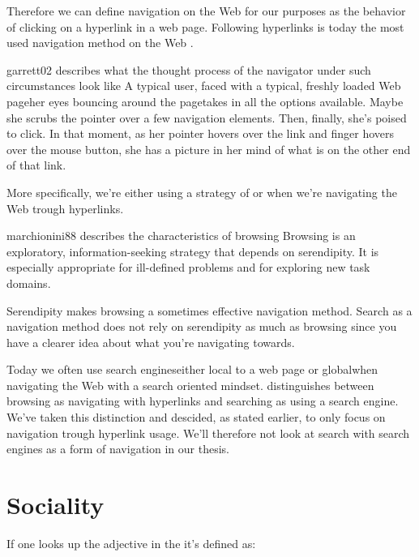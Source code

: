 Therefore we can define navigation on the Web for our purposes as the
behavior of clicking on a hyperlink in a web page. Following hyperlinks is
today the most used navigation method on the Web \citep[]{weinreich08}.
\begin{fullquote}{garrett02}{%
  describes what the thought process of the navigator under
  such circumstances look like}
    A typical user, faced with a typical, freshly loaded Web page\dash{}her
    eyes bouncing around the page\dash{}takes in all the options available.
    Maybe she scrubs the pointer over a few navigation elements. Then,
    finally, she's poised to click. In that moment, as her pointer hovers over
    the link and finger hovers over the mouse button, she has a picture in her
    mind of what is on the other end of that link.
\end{fullquote}

More specifically, we're either using a strategy of  or
 when we're navigating the Web trough hyperlinks.
\begin{fullquote}[\p{71}]{marchionini88}{%
  describes the characteristics of browsing}
    Browsing is an exploratory, information-seeking
    strategy that depends on serendipity. It is
    especially appropriate for ill-defined problems
    and for exploring new task domains.
\end{fullquote}
Serendipity\dash{}%
\dash{}makes browsing a sometimes effective navigation method.
Search as a navigation method does not rely on serendipity as much as browsing
since you have a clearer idea about what you're navigating towards.

Today we often use search engines\dash{}either local to a web page or
global\dash{}when navigating the Web with a search oriented mindset.
\citet[]{freyne07} distinguishes between browsing as navigating
with hyperlinks and searching as using a search engine. We've taken this
distinction and descided, as stated earlier, to only focus on navigation
trough hyperlink usage. We'll therefore not look at search with search engines
as a form of navigation in our thesis.

\section{Sociality}

If one looks up the adjective  in the
 \citep[]{simpson89}
it's defined as:

